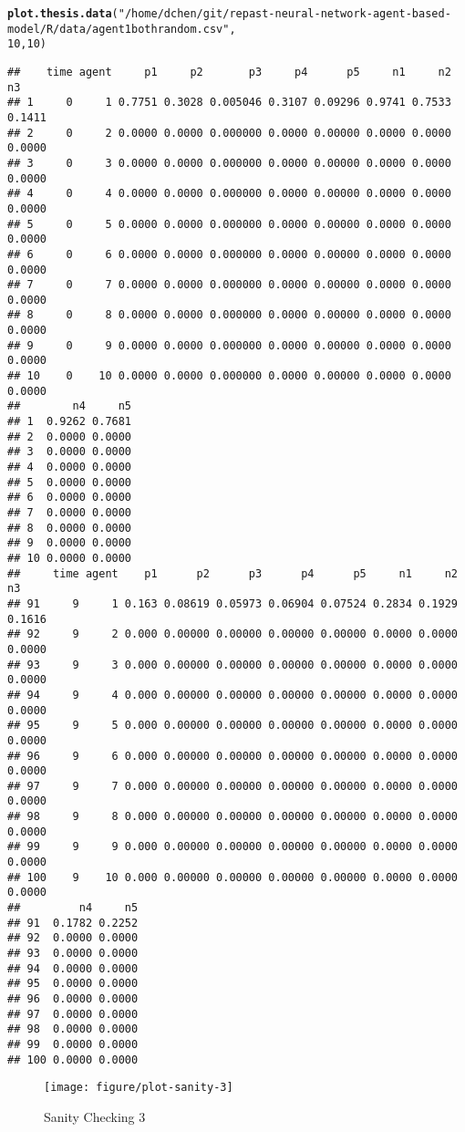 \documentclass{article}\usepackage[]{graphicx}\usepackage[]{color}
\makeatletter
\def\maxwidth{ %
  \ifdim\Gin@nat@width>\linewidth
    \linewidth
  \else
    \Gin@nat@width
  \fi
}
\newcommand{\hlnum}[1]{\textcolor[rgb]{0.686,0.059,0.569}{#1}}%
\newcommand{\hlstr}[1]{\textcolor[rgb]{0.192,0.494,0.8}{#1}}%
\newcommand{\hlstd}[1]{\textcolor[rgb]{0.345,0.345,0.345}{#1}}%
\newcommand{\hlkwd}[1]{\textcolor[rgb]{0.737,0.353,0.396}{\textbf{#1}}}%
\newenvironment{kframe}{%
 \def\at@end@of@kframe{}%
 \ifinner\ifhmode%
  \def\at@end@of@kframe{\end{minipage}}%
  \begin{minipage}{\columnwidth}%
 \fi\fi%
 \def\FrameCommand##1{\hskip\@totalleftmargin \hskip-\fboxsep
 \colorbox{shadecolor}{##1}\hskip-\fboxsep
     \hskip-\linewidth \hskip-\@totalleftmargin \hskip\columnwidth}%
 \MakeFramed {\advance\hsize-\width
   \@totalleftmargin\z@ \linewidth\hsize
   \@setminipage}}%
 {\par\unskip\endMakeFramed%
 \at@end@of@kframe}
\newenvironment{knitrout}{}{} %
\makeatother
\begin{document}
\begin{knitrout}
\color{fgcolor}\begin{kframe}
\begin{alltt}
\hlkwd{plot.thesis.data}\hlstd{(}\hlstr{"/home/dchen/git/repast-neural-network-agent-based-model/R/data/agent1bothrandom.csv"}\hlstd{,}
    \hlnum{10}\hlstd{,} \hlnum{10}\hlstd{)}
\end{alltt}
\begin{verbatim}
##    time agent     p1     p2       p3     p4      p5     n1     n2     n3
## 1     0     1 0.7751 0.3028 0.005046 0.3107 0.09296 0.9741 0.7533 0.1411
## 2     0     2 0.0000 0.0000 0.000000 0.0000 0.00000 0.0000 0.0000 0.0000
## 3     0     3 0.0000 0.0000 0.000000 0.0000 0.00000 0.0000 0.0000 0.0000
## 4     0     4 0.0000 0.0000 0.000000 0.0000 0.00000 0.0000 0.0000 0.0000
## 5     0     5 0.0000 0.0000 0.000000 0.0000 0.00000 0.0000 0.0000 0.0000
## 6     0     6 0.0000 0.0000 0.000000 0.0000 0.00000 0.0000 0.0000 0.0000
## 7     0     7 0.0000 0.0000 0.000000 0.0000 0.00000 0.0000 0.0000 0.0000
## 8     0     8 0.0000 0.0000 0.000000 0.0000 0.00000 0.0000 0.0000 0.0000
## 9     0     9 0.0000 0.0000 0.000000 0.0000 0.00000 0.0000 0.0000 0.0000
## 10    0    10 0.0000 0.0000 0.000000 0.0000 0.00000 0.0000 0.0000 0.0000
##        n4     n5
## 1  0.9262 0.7681
## 2  0.0000 0.0000
## 3  0.0000 0.0000
## 4  0.0000 0.0000
## 5  0.0000 0.0000
## 6  0.0000 0.0000
## 7  0.0000 0.0000
## 8  0.0000 0.0000
## 9  0.0000 0.0000
## 10 0.0000 0.0000
##     time agent    p1      p2      p3      p4      p5     n1     n2     n3
## 91     9     1 0.163 0.08619 0.05973 0.06904 0.07524 0.2834 0.1929 0.1616
## 92     9     2 0.000 0.00000 0.00000 0.00000 0.00000 0.0000 0.0000 0.0000
## 93     9     3 0.000 0.00000 0.00000 0.00000 0.00000 0.0000 0.0000 0.0000
## 94     9     4 0.000 0.00000 0.00000 0.00000 0.00000 0.0000 0.0000 0.0000
## 95     9     5 0.000 0.00000 0.00000 0.00000 0.00000 0.0000 0.0000 0.0000
## 96     9     6 0.000 0.00000 0.00000 0.00000 0.00000 0.0000 0.0000 0.0000
## 97     9     7 0.000 0.00000 0.00000 0.00000 0.00000 0.0000 0.0000 0.0000
## 98     9     8 0.000 0.00000 0.00000 0.00000 0.00000 0.0000 0.0000 0.0000
## 99     9     9 0.000 0.00000 0.00000 0.00000 0.00000 0.0000 0.0000 0.0000
## 100    9    10 0.000 0.00000 0.00000 0.00000 0.00000 0.0000 0.0000 0.0000
##         n4     n5
## 91  0.1782 0.2252
## 92  0.0000 0.0000
## 93  0.0000 0.0000
## 94  0.0000 0.0000
## 95  0.0000 0.0000
## 96  0.0000 0.0000
## 97  0.0000 0.0000
## 98  0.0000 0.0000
## 99  0.0000 0.0000
## 100 0.0000 0.0000
\end{verbatim}
\end{kframe}\begin{figure}[]

\texttt{[image: figure/plot-sanity-3]} \caption[Sanity Checking 3]{Sanity Checking 3\label{fig:plot-sanity-3}}
\end{figure}


\end{knitrout}
\end{document}
